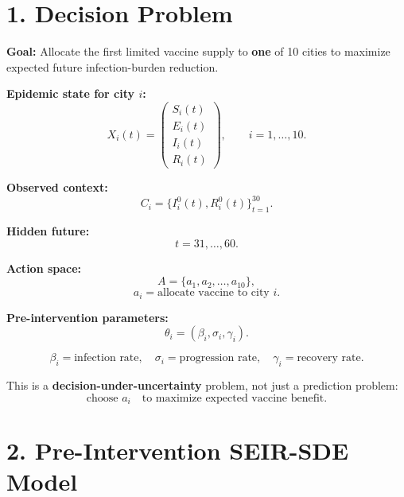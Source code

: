 \documentclass[15pt]{extarticle}
\begin{document}
\large

\newpage
\section*{1. Decision Problem}

\begin{tcolorbox}
\textbf{Goal:} Allocate the first limited vaccine supply to \textbf{one} of 10 cities to maximize expected future infection-burden reduction.
\end{tcolorbox}

\vspace{0.12cm}

\begin{minipage}[t]{0.47\textwidth}
\textbf{Epidemic state for city \(i\):}
\[
X_i(t)=
\begin{pmatrix}
S_i(t)\\
E_i(t)\\
I_i(t)\\
R_i(t)
\end{pmatrix},
\qquad i=1,\ldots,10.
\]

\textbf{Observed context:}
\[
C_i=\{I_i^0(t),R_i^0(t)\}_{t=1}^{30}.
\]

\textbf{Hidden future:}
\[
t=31,\ldots,60.
\]
\end{minipage}
\hfill
\begin{minipage}[t]{0.47\textwidth}
\textbf{Action space:}
\[
A=\{a_1,a_2,\ldots,a_{10}\},
\]
\[
a_i=\text{allocate vaccine to city }i.
\]

\textbf{Pre-intervention parameters:}
\[
\theta_i=(\beta_i,\sigma_i,\gamma_i).
\]

\[
\beta_i=\text{infection rate},\quad
\sigma_i=\text{progression rate},\quad
\gamma_i=\text{recovery rate}.
\]
\end{minipage}

\vspace{0.22cm}

\begin{tcolorbox}
This is a \textbf{decision-under-uncertainty} problem, not just a prediction problem:
\[
\text{choose }a_i
\quad\text{to maximize expected vaccine benefit.}
\]
\end{tcolorbox}


\newpage
\section*{2. Pre-Intervention SEIR-SDE Model}
\end{document}
